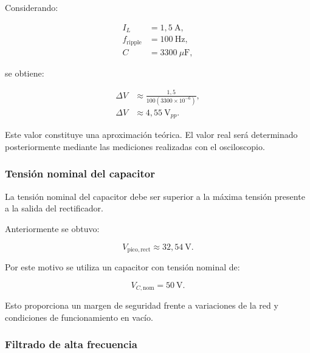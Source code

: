 \documentclass[12pt,a4paper]{article}
\begin{document}
	Considerando:
	
	\begin{align}
		I_L &=1,5~\text{A},
		\\
		f_{\mathrm{ripple}}&=100~\text{Hz},
		\\
		C&=3300~\mu\text{F},
	\end{align}
	
	se obtiene:
	
	\begin{align}
		\Delta V
		&\approx
		\frac{1,5}
		{100(3300\times10^{-6})},
		\\
		\Delta V
		&\approx
		4,55~\text{V}_{pp}.
	\end{align}
	
	Este valor constituye una aproximación teórica. El valor real será determinado
	posteriormente mediante las mediciones realizadas con el osciloscopio.
	
	\subsubsection{Tensión nominal del capacitor}
	
	La tensión nominal del capacitor debe ser superior a la máxima tensión presente
	a la salida del rectificador.
	
	Anteriormente se obtuvo:
	
	\begin{equation}
		V_{\mathrm{pico,rect}}
		\approx
		32,54~\text{V}.
	\end{equation}
	
	Por este motivo se utiliza un capacitor con tensión nominal de:
	
	\begin{equation}
		V_{C,\mathrm{nom}}
		=
		50~\text{V}.
	\end{equation}
	
	Esto proporciona un margen de seguridad frente a variaciones de la red y
	condiciones de funcionamiento en vacío.
	
	\subsubsection{Filtrado de alta frecuencia}
	
\end{document}

